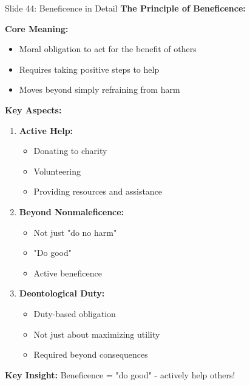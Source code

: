 \documentclass[8pt]{beamer}
\begin{document}
	\begin{frame}{Slide 44: Beneficence in Detail}
		\fontsize{6.5}{7.5}\selectfont
		\textbf{The Principle of Beneficence:}
		
		\vspace{0.1cm}
		\textbf{Core Meaning:}
		\begin{itemize}
			\item Moral obligation to act for the benefit of others
			\item Requires taking positive steps to help
			\item Moves beyond simply refraining from harm
		\end{itemize}
		
		\vspace{0.1cm}
		\textbf{Key Aspects:}
		\begin{enumerate}
			\item \textbf{Active Help:}
			\begin{itemize}
				\item Donating to charity
				\item Volunteering
				\item Providing resources and assistance
			\end{itemize}
			\item \textbf{Beyond Nonmaleficence:}
			\begin{itemize}
				\item Not just "do no harm"
				\item "Do good"
				\item Active beneficence
			\end{itemize}
			\item \textbf{Deontological Duty:}
			\begin{itemize}
				\item Duty-based obligation
				\item Not just about maximizing utility
				\item Required beyond consequences
			\end{itemize}
		\end{enumerate}
		
		\textcolor{myblue}{\textbf{Key Insight:}} Beneficence = \textcolor{myblue}{"do good"} - actively help others!
	\end{frame}
	
\end{document}
